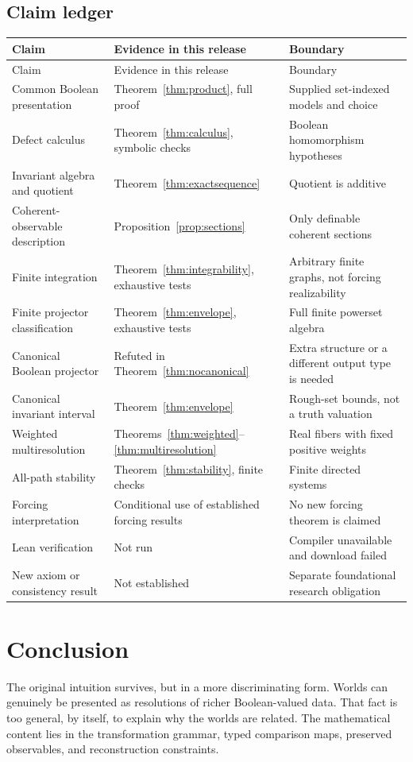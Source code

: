 \documentclass[11pt,letterpaper]{article}
\theoremstyle{definition}
\begin{document}
\subsection{Claim ledger}
\begin{longtable}{p{.32\linewidth}p{.33\linewidth}p{.27\linewidth}}
\toprule
Claim & Evidence in this release & Boundary\\
\midrule
\endfirsthead
\toprule Claim & Evidence in this release & Boundary\\\midrule\endhead
Common Boolean presentation & Theorem~\ref{thm:product}, full proof & Supplied set-indexed models and choice\\
Defect calculus & Theorem~\ref{thm:calculus}, symbolic checks & Boolean homomorphism hypotheses\\
Invariant algebra and quotient & Theorem~\ref{thm:exactsequence} & Quotient is additive\\
Coherent-observable description & Proposition~\ref{prop:sections} & Only definable coherent sections\\
Finite integration & Theorem~\ref{thm:integrability}, exhaustive tests & Arbitrary finite graphs, not forcing realizability\\
Finite projector classification & Theorem~\ref{thm:envelope}, exhaustive tests & Full finite powerset algebra\\
Canonical Boolean projector & Refuted in Theorem~\ref{thm:nocanonical} & Extra structure or a different output type is needed\\
Canonical invariant interval & Theorem~\ref{thm:envelope} & Rough-set bounds, not a truth valuation\\
Weighted multiresolution & Theorems~\ref{thm:weighted}--\ref{thm:multiresolution} & Real fibers with fixed positive weights\\
All-path stability & Theorem~\ref{thm:stability}, finite checks & Finite directed systems\\
Forcing interpretation & Conditional use of established forcing results & No new forcing theorem is claimed\\
Lean verification & Not run & Compiler unavailable and download failed\\
New axiom or consistency result & Not established & Separate foundational research obligation\\
\bottomrule
\end{longtable}

\section{Conclusion}
The original intuition survives, but in a more discriminating form. Worlds can genuinely be presented as resolutions of richer Boolean-valued data. That fact is too general, by itself, to explain why the worlds are related. The mathematical content lies in the transformation grammar, typed comparison maps, preserved observables, and reconstruction constraints.
\end{document}
